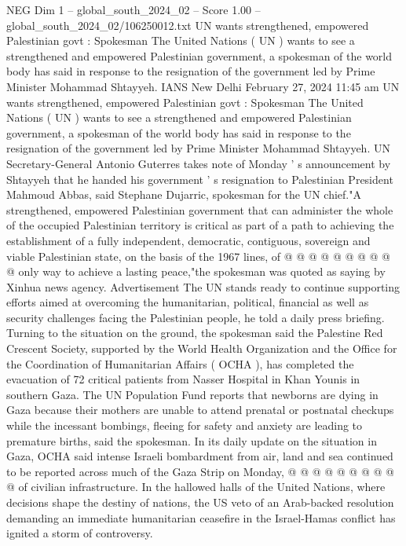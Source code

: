 \begin{textsample}{NEG Dim 1 – global\_south\_2024\_02 – Score 1.00 – global\_south\_2024\_02/106250012.txt}  \label{ex:f1_neg_253}
UN wants strengthened, empowered Palestinian govt : Spokesman The United Nations ( UN ) wants to see a strengthened and empowered Palestinian government, a spokesman of the world body has said in response to the resignation of the government led by Prime Minister Mohammad Shtayyeh.
IANS New Delhi February 27, 2024 11:45 am UN wants strengthened, empowered Palestinian govt : Spokesman The United Nations ( UN ) wants to see a strengthened and empowered Palestinian government, a spokesman of the world body has said in response to the resignation of the government led by Prime Minister Mohammad Shtayyeh.
UN Secretary-General Antonio Guterres takes note of Monday ' s announcement by Shtayyeh that he handed his government ' s resignation to Palestinian President Mahmoud Abbas, said Stephane Dujarric, spokesman for the UN chief."A strengthened, empowered Palestinian government that can administer the whole of the occupied Palestinian territory is critical as part of a path to achieving the establishment of a fully independent, democratic, contiguous, sovereign and viable Palestinian state, on the basis of the 1967 lines, of @ @ @ @ @ @ @ @ @ @ only way to achieve a lasting peace,"the spokesman was quoted as saying by Xinhua news agency.
Advertisement The UN stands ready to continue supporting efforts aimed at overcoming the humanitarian, political, financial as well as security challenges facing the Palestinian people, he told a daily press briefing.
Turning to the situation on the ground, the spokesman said the Palestine Red Crescent Society, supported by the World Health Organization and the Office for the Coordination of Humanitarian Affairs ( OCHA ), has completed the evacuation of 72 critical patients from Nasser Hospital in Khan Younis in southern Gaza.
The UN Population Fund reports that newborns are dying in Gaza because their mothers are unable to attend prenatal or postnatal checkups while the incessant bombings, fleeing for safety and anxiety are leading to premature births, said the spokesman.
In its daily update on the situation in Gaza, OCHA said intense Israeli bombardment from air, land and sea continued to be reported across much of the Gaza Strip on Monday, @ @ @ @ @ @ @ @ @ @ of civilian infrastructure.
In the hallowed halls of the United Nations, where decisions shape the destiny of nations, the US veto of an Arab-backed resolution demanding an immediate humanitarian ceasefire in the Israel-Hamas conflict has ignited a storm of controversy.

\end{textsample}
